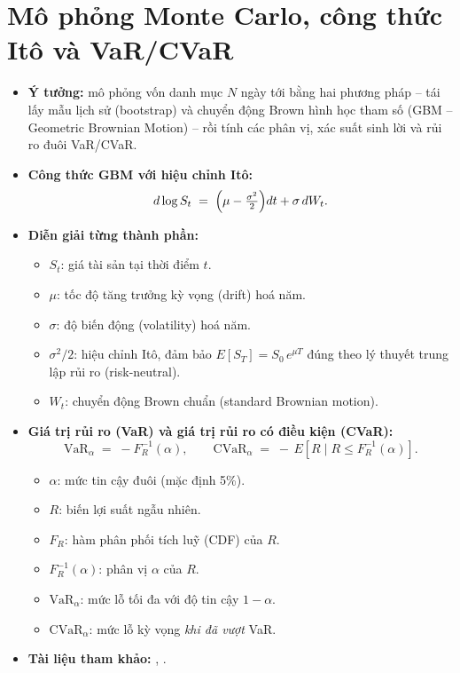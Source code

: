 \documentclass[12pt,a4paper,openany,oneside]{report}
\numberwithin{equation}{chapter}
\begin{document}
\section{Mô phỏng Monte Carlo, công thức Itô và VaR/CVaR}

\begin{itemize}[leftmargin=18pt,topsep=2pt,itemsep=4pt]
  \item \textbf{Ý tưởng:} mô phỏng vốn danh mục $N$ ngày tới bằng hai
        phương pháp -- tái lấy mẫu lịch sử (bootstrap) và chuyển động
        Brown hình học tham số (GBM -- Geometric Brownian Motion) --
        rồi tính các phân vị, xác suất sinh lời và rủi ro đuôi VaR/CVaR.
  \item \textbf{Công thức GBM với hiệu chỉnh Itô:}
        \begin{equation}
          d \log S_t \;=\; \Bigl(\mu - \tfrac{\sigma^2}{2}\Bigr) dt
                          + \sigma\, dW_t.
          \label{eq:gbm}
        \end{equation}
  \item \textbf{Diễn giải từng thành phần:}
        \begin{itemize}[leftmargin=14pt,topsep=2pt,itemsep=1pt]
          \item $S_t$: giá tài sản tại thời điểm $t$.
          \item $\mu$: tốc độ tăng trưởng kỳ vọng (drift) hoá năm.
          \item $\sigma$: độ biến động (volatility) hoá năm.
          \item $\sigma^2/2$: hiệu chỉnh Itô, đảm bảo
                $E[S_T] = S_0\, e^{\mu T}$ đúng theo lý thuyết trung
                lập rủi ro (risk-neutral).
          \item $W_t$: chuyển động Brown chuẩn (standard Brownian motion).
        \end{itemize}
  \item \textbf{Giá trị rủi ro (VaR) và giá trị rủi ro có điều kiện
        (CVaR):}
        \begin{equation}
          \mathrm{VaR}_\alpha \;=\; -F_R^{-1}(\alpha),
          \qquad
          \mathrm{CVaR}_\alpha \;=\;
          -\,E\!\left[R \;\big|\; R \le F_R^{-1}(\alpha)\right].
          \label{eq:varcvar}
        \end{equation}
        \begin{itemize}[leftmargin=14pt,topsep=2pt,itemsep=1pt]
          \item $\alpha$: mức tin cậy đuôi (mặc định 5\%).
          \item $R$: biến lợi suất ngẫu nhiên.
          \item $F_R$: hàm phân phối tích luỹ (CDF) của $R$.
          \item $F_R^{-1}(\alpha)$: phân vị $\alpha$ của $R$.
          \item $\mathrm{VaR}_\alpha$: mức lỗ tối đa với độ tin cậy $1-\alpha$.
          \item $\mathrm{CVaR}_\alpha$: mức lỗ kỳ vọng \emph{khi đã vượt} VaR.
        \end{itemize}
  \item \textbf{Tài liệu tham khảo:} \citet{Jorion2007},
        \citet{RockafellarUryasev2000}.
\end{itemize}
\end{document}
